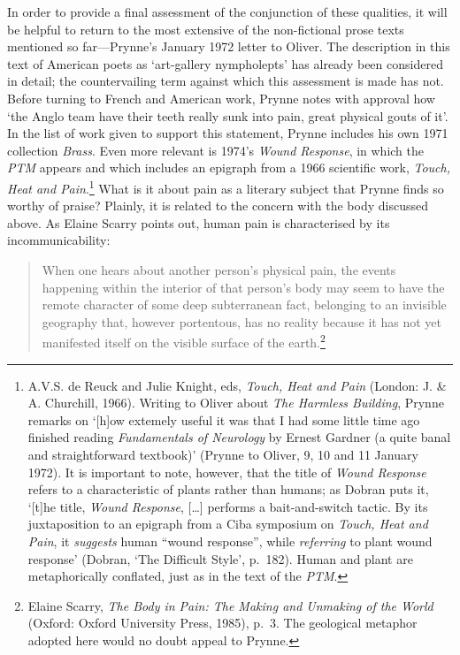 \documentclass[]{article}
\begin{document}
In order to provide a final assessment of the conjunction of these
qualities, it will be helpful to return to the most extensive of the
non-fictional prose texts mentioned so far—Prynne’s January 1972 letter
to Oliver. The description in this text of American poets as
‘art-gallery nympholepts’ has already been considered in detail; the
countervailing term against which this assessment is made has not.
Before turning to French and American work, Prynne notes with approval
how ‘the Anglo team have their teeth really sunk into pain, great
physical gouts of it’. In the list of work given to support this
statement, Prynne includes his own 1971 collection \emph{Brass}. Even
more relevant is 1974’s \emph{Wound Response}, in which the \emph{PTM}
appears and which includes an epigraph from a 1966 scientific work,
\emph{Touch, Heat and Pain}.\footnote{A.V.S. de Reuck and Julie Knight,
  eds, \emph{Touch, Heat and Pain} (London: J. \& A. Churchill, 1966).
  Writing to Oliver about \emph{The Harmless Building}, Prynne remarks
  on ‘{[}h{]}ow extemely useful it was that I had some little time ago
  finished reading \emph{Fundamentals of Neurology} by Ernest Gardner (a
  quite banal and straightforward textbook)’ (Prynne to Oliver, 9, 10
  and 11 January 1972). It is important to note, however, that the title
  of \emph{Wound Response} refers to a characteristic of plants rather
  than humans; as Dobran puts it, ‘{[}t{]}he title, \emph{Wound
  Response}, {[}\ldots{}{]} performs a bait-and-switch tactic. By its
  juxtaposition to an epigraph from a Ciba symposium on \emph{Touch,
  Heat and Pain}, it \emph{suggests} human “wound response”, while
  \emph{referring} to plant wound response’ (Dobran, ‘The Difficult
  Style’, p.~182). Human and plant are metaphorically conflated, just as
  in the text of the \emph{PTM}.} What is it about pain as a literary
subject that Prynne finds so worthy of praise? Plainly, it is related to
the concern with the body discussed above. As Elaine Scarry points out,
human pain is characterised by its incommunicability:

\begin{quote}
\singlespacing When one hears about another person’s physical pain, the
events happening within the interior of that person’s body may seem to
have the remote character of some deep subterranean fact, belonging to
an invisible geography that, however portentous, has no reality because
it has not yet manifested itself on the visible surface of the
earth.\footnote{Elaine Scarry, \emph{The Body in Pain: The Making and
  Unmaking of the World} (Oxford: Oxford University Press, 1985), p.~3.
  The geological metaphor adopted here would no doubt appeal to Prynne.}
\end{quote}
\end{document}
